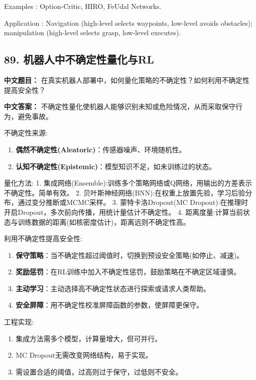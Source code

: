 \documentclass[10pt,a4paper]{ctexart}
\begin{document}
 Examples : Option-Critic, HIRO, FeUdal Networks.

 Application : Navigation (high-level selects waypoints, low-level avoids obstacles); manipulation (high-level selects grasp, low-level executes).

\subsection*{89. 机器人中不确定性量化与RL}
\textbf{中文题目：} 在真实机器人部署中，如何量化策略的不确定性？如何利用不确定性提高安全性？

\textbf{中文答案：}  
不确定性量化使机器人能够识别未知或危险情况，从而采取保守行为，避免事故。

 不确定性来源:
\begin{enumerate}
    \item \textbf{偶然不确定性(Aleatoric)}：传感器噪声、环境随机性。
    \item \textbf{认知不确定性(Epistemic)}：模型知识不足，如未训练过的状态。
\end{enumerate}

 量化方法:
1.  集成网络(Ensemble):训练多个策略网络或Q网络，用输出的方差表示不确定性。简单有效。
2.  贝叶斯神经网络(BNN):在权重上放置先验，学习后验分布，通过变分推断或MCMC采样。
3.  蒙特卡洛Dropout(MC Dropout):在推理时开启Dropout，多次前向传播，用统计量估计不确定性。
4.  距离度量:计算当前状态与训练数据的距离(如核密度估计)，距离远则不确定性高。

 利用不确定性提高安全性:
\begin{enumerate}
    \item \textbf{保守策略}：当不确定性超过阈值时，切换到预设安全策略(如停止、减速)。
    \item \textbf{奖励惩罚}：在RL训练中加入不确定性惩罚，鼓励策略在不确定区域谨慎。
    \item \textbf{主动学习}：主动选择高不确定性状态进行探索或请求人类帮助。
    \item \textbf{安全屏障}：用不确定性校准屏障函数的参数，使屏障更保守。
\end{enumerate}

 工程实现:
\begin{enumerate}
    \item 集成方法需多个模型，计算量增大，但可并行。
    \item MC Dropout无需改变网络结构，易于实现。
    \item 需设置合适的阈值，过高则过于保守，过低则不安全。
\end{enumerate}
\end{document}
